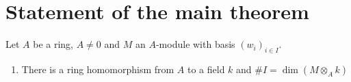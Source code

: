 \section{Statement of the main theorem}

\begin{ex}
	Let $A$ be a ring, $A \neq 0$ and $M$ an $A$-module with basis $(w_i)_{i \in I}$.
	\begin{enumerate}[label=\alph*)]
		\item There is a ring homomorphism from $A$ to a field $k$ and $\#I = \dim(M \otimes_A k)$
	\end{enumerate}
\end{ex}

\begin{sol}
	
\end{sol}

